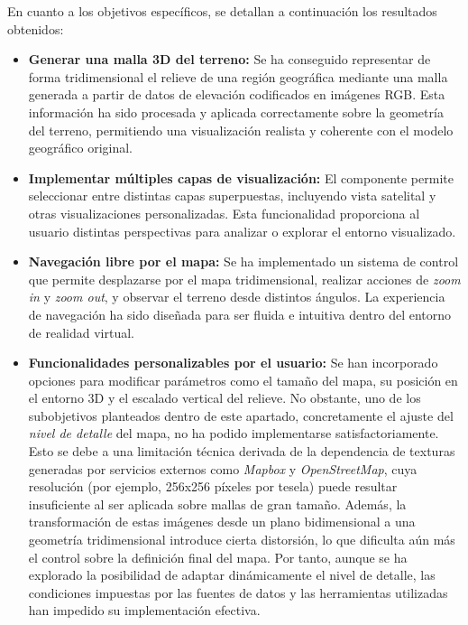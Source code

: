 \documentclass[a4paper, 12pt]{book}
\begin{document}
En cuanto a los objetivos específicos, se detallan a continuación los resultados obtenidos:

\begin{itemize}
  \item \textbf{Generar una malla 3D del terreno:} Se ha conseguido representar de forma tridimensional el relieve de una región geográfica mediante una malla generada a partir de datos de elevación codificados en imágenes RGB. Esta información ha sido procesada y aplicada correctamente sobre la geometría del terreno, permitiendo una visualización realista y coherente con el modelo geográfico original.

  \item \textbf{Implementar múltiples capas de visualización:} El componente permite seleccionar entre distintas capas superpuestas, incluyendo vista satelital y otras visualizaciones personalizadas. Esta funcionalidad proporciona al usuario distintas perspectivas para analizar o explorar el entorno visualizado.

  \item \textbf{Navegación libre por el mapa:} Se ha implementado un sistema de control que permite desplazarse por el mapa tridimensional, realizar acciones de \textit{zoom in} y \textit{zoom out}, y observar el terreno desde distintos ángulos. La experiencia de navegación ha sido diseñada para ser fluida e intuitiva dentro del entorno de realidad virtual.

  \item \textbf{Funcionalidades personalizables por el usuario:} Se han incorporado opciones para modificar parámetros como el tamaño del mapa, su posición en el entorno 3D y el escalado vertical del relieve. No obstante, uno de los subobjetivos planteados dentro de este apartado, concretamente el ajuste del \textit{nivel de detalle} del mapa, no ha podido implementarse satisfactoriamente. Esto se debe a una limitación técnica derivada de la dependencia de texturas generadas por servicios externos como \textit{Mapbox} y \textit{OpenStreetMap}, cuya resolución (por ejemplo, 256x256 píxeles por tesela) puede resultar insuficiente al ser aplicada sobre mallas de gran tamaño. Además, la transformación de estas imágenes desde un plano bidimensional a una geometría tridimensional introduce cierta distorsión, lo que dificulta aún más el control sobre la definición final del mapa. Por tanto, aunque se ha explorado la posibilidad de adaptar dinámicamente el nivel de detalle, las condiciones impuestas por las fuentes de datos y las herramientas utilizadas han impedido su implementación efectiva.
\end{itemize}
\end{document}
